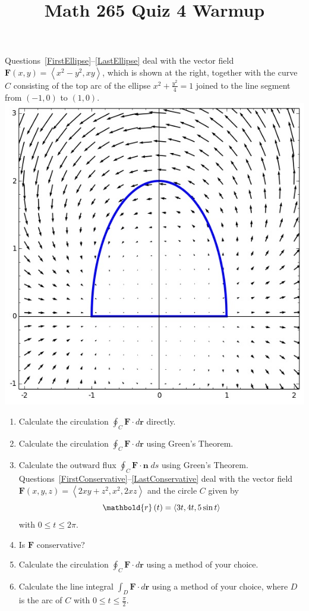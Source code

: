 \documentclass[12pt]{article}
\title{Math 265 Quiz 4 Warmup}\author{}\date{}
\let\cos\relax\DeclareMathOperator{\cos}{\mathsf{cos}}
\begin{document}
\maketitle
\thispagestyle{empty}
\begin{multicols}{2}
Questions~\ref{FirstEllipse}--\ref{LastEllipse}
deal with the vector field $\mathbold{F}\left(x,y\right)
=\left\langle x^2-y^2,xy\right\rangle$, which is shown
at the right, together with the curve $C$ consisting of
the top arc of the ellipse $x^2+\frac{y^2}{4}=1$
joined to the line segment from $\left(-1,0\right)$
to $\left(1,0\right)$.
\includegraphics[scale=.4]{Ellipse}
\end{multicols}
\begin{enumerate}
\item\label{FirstEllipse}
Calculate the circulation $\oint_C\mathbold{F}
\cdot d\mathbold{r}$ directly.
\item Calculate the circulation $\oint_C\mathbold{F}
\cdot d\mathbold{r}$ using Green's Theorem.
\item\label{LastEllipse} Calculate the outward flux $\oint_C\mathbold{F}
\cdot\mathbold{n}\;ds$ using Green's Theorem.
Questions~\ref{FirstConservative}--\ref{LastConservative}
deal with
the vector field $\mathbold{F}\left(x,y,z\right)
=\left\langle 2xy+z^2,x^2,2xz\right\rangle$
and the circle $C$ given by
\[\mathbold{r}\left(t\right)=\left\langle
3\cos{t},4\cos{t},5\sin{t}\right\rangle\]
with $0\le t\le 2\pi$.
\item\label{FirstConservative} Is $\mathbold{F}$ conservative?
\item Calculate the circulation $\oint_C\mathbold{F}
\cdot d\mathbold{r}$ using a method of your choice.
\item\label{LastConservative}
Calculate the line integral $\int_D\mathbold{F}
\cdot d\mathbold{r}$ using a method of your choice,
where $D$ is the arc of $C$ with $0\le t\le\frac{\pi}{2}$.
\end{enumerate}
\end{document}
